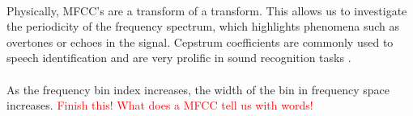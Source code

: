 \documentclass[12pt,letterpaper]{article}
\begin{document}
\paragraph*{}Physically, MFCC's are a transform of a transform. This allows us to investigate the periodicity of the frequency spectrum, which highlights phenomena such as overtones or echoes in the signal\cite{Virtanen}. Cepstrum coefficients are commonly used to speech identification and are very prolific in sound recognition tasks \cite{Serizel,Sahidullah,Liu}. 

\paragraph*{}As the frequency bin index increases, the width of the bin in frequency space increases. \textcolor{red}{Finish this! What does a MFCC tell us with words!}
\end{document}

